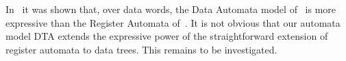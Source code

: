 \documentclass{CSML}
\newcommand\dad{\textup{DTA}\xspace}
\begin{document}
In~\cite{BjSch10} it was shown that, over data words, the Data Automata model
of~\cite{BDMSS11} is more expressive than the Register Automata
of~\cite{KF94}. It is not obvious that our automata model \dad extends the
expressive power of the straightforward extension of register automata to data
trees. This remains to be investigated.



 


 
\end{document}
